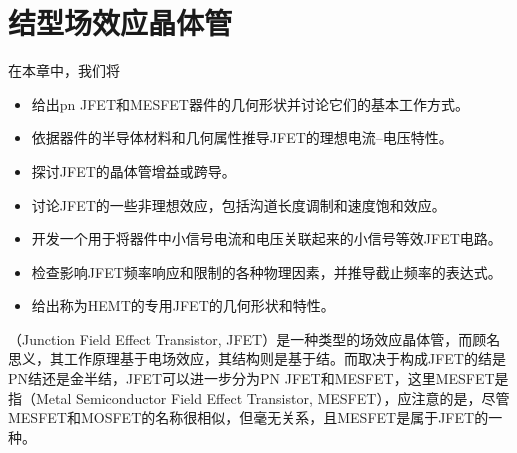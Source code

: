 \chapter{结型场效应晶体管}
在本章中，我们将
\begin{itemize}
    \item 给出pn JFET和MESFET器件的几何形状并讨论它们的基本工作方式。
    \item 依据器件的半导体材料和几何属性推导JFET的理想电流--电压特性。
    \item 探讨JFET的晶体管增益或跨导。
    \item 讨论JFET的一些非理想效应，包括沟道长度调制和速度饱和效应。
    \item 开发一个用于将器件中小信号电流和电压关联起来的小信号等效JFET电路。
    \item 检查影响JFET频率响应和限制的各种物理因素，并推导截止频率的表达式。
    \item 给出称为HEMT的专用JFET的几何形状和特性。
\end{itemize}
（Junction Field Effect Transistor, JFET）是一种类型的场效应晶体管，而顾名思义，其工作原理基于电场效应，其结构则是基于结。而取决于构成JFET的结是PN结还是金半结，JFET可以进一步分为PN JFET和MESFET，这里MESFET是指（Metal Semiconductor Field Effect Transistor, MESFET），应注意的是，尽管MESFET和MOSFET的名称很相似，但毫无关系，且MESFET是属于JFET的一种。


